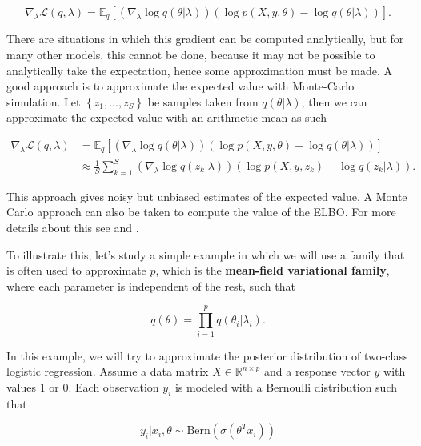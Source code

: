 \begin{equation}
  \label{eq:ELBO_gradient}
  \nabla_{\lambda} \mathcal{L}(q, \lambda) =
  \mathbb{E}_q \left[ \left( \nabla_{\lambda} \log q(\theta | \lambda) \right) \left( \log p(X, y, \theta) - \log q(\theta | \lambda) \right) \right].
\end{equation}

There are situations in which this gradient can be computed analytically, but for many other models, this cannot be done, because it may not be possible to analytically take the expectation, hence some approximation must be made. A good approach is to approximate the expected value with Monte-Carlo simulation. Let $\left\{ z_1, ..., z_S \right\}$ be samples taken from $q(\theta | \lambda)$, then we can approximate the expected value with an arithmetic mean as such

\begin{equation*}
  \begin{split}
  \nabla_{\lambda} \mathcal{L}(q, \lambda) &=
  \mathbb{E}_q \left[ \left( \nabla_{\lambda} \log q(\theta | \lambda) \right) \left( \log p(X, y, \theta) - \log q(\theta | \lambda) \right) \right] \\
  & \approx \frac{1}{S} \sum_{k = 1}^S \left( \nabla_{\lambda} \log q(z_k | \lambda) \right) \left( \log p(X, y, z_k) - \log q(z_k | \lambda) \right).
  \end{split}
\end{equation*}


This approach gives noisy but unbiased estimates of the expected value. A Monte Carlo approach can also be taken to compute the value of the ELBO. For more details about this see \cite{kucukelbir2017automatic} and \cite{ranganath2014black}.

To illustrate this, let's study a simple example in which we will use a family that is often used to approximate $p$, which is the \textbf{mean-field variational family}, where each parameter is independent of the rest, such that

$$
  q(\theta) = \prod_{i = 1}^p q(\theta_i | \lambda_i).
$$

In this example, we will try to approximate the posterior distribution of two-class logistic regression. Assume a data matrix $X \in \mathbb{R}^{n \times p}$ and a response vector $y$ with values 1 or 0. Each observation $y_i$ is modeled with a Bernoulli distribution such that

$$
  y_i | x_i, \theta \sim \mathrm{Bern}(\sigma(\theta^T x_i))
$$

